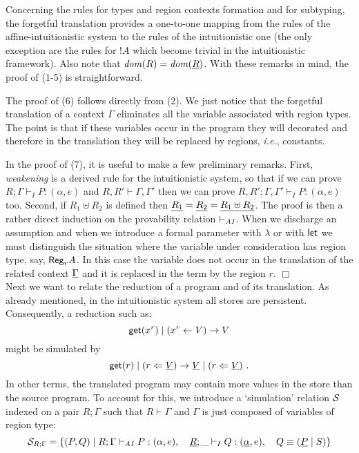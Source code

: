\documentclass[11pt]{article}
\newcommand{\qed}{\hfill${\Box}$}
\newcommand{\cl}[1]{{\cal #1}}          \newcommand{\la}{\langle}               \newcommand{\ra}{\rangle}
\newcommand{\Gives}{\vdash}             \newcommand{\IGives}{\vdash_{I}}        \newcommand{\AIGives}{\vdash_{{\it AI}}} \newcommand{\CGives}{\vdash_{C}}
\newcommand{\arrow}{\rightarrow}        \newcommand{\trarrow}{\stackrel{*}{\rightarrow}}        \newcommand{\limp}{\multimap} \newcommand{\bang}{\oc}
\newcommand{\csum}{\uplus}              \newcommand{\dpar}{\mid\!\mid}
\newcommand{\s}[1]{{\sf #1}}    \newcommand{\vc}[1]{{\bf #1}}
\newcommand{\set}[1]{\{#1\}}
\newcommand{\get}[1]{{\sf get}(#1)}
\newcommand{\store}[2]{(#1 \leftarrow #2)}
\newcommand{\pstore}[2]{(#1 \Leftarrow #2)}
\newcommand{\regtype}[2]{{\sf Reg}_{#1} #2}
\begin{document}
Concerning the rules for types and region contexts formation and for subtyping,
the forgetful translation provides a one-to-one mapping 
from the rules of the affine-intuitionistic system to the
rules of the intuitionistic one (the only exception are the rules
for $!A$ which become trivial in the intuitionistic framework).
Also note that ${\it dom}(R)= {\it dom}(\underline{R})$. 
With these remarks in mind, the proof of (1-5) is 
straightforward.

The proof of (6) follows directly from (2). We just
notice that the forgetful translation of a context $\Gamma$ 
eliminates all the variable associated with  region types.
The point is that if these variables occur in the program
they will decorated and therefore in the translation they will be replaced
by regions, {\em i.e.}, constants.

In the proof of (7), it is useful to make a few preliminary remarks.
First, {\em weakening} is a derived rule for the intuitionistic system,
so that if we can prove $R;\Gamma\IGives P:(\alpha,e)$ and 
$R,R'\Gives \Gamma,\Gamma'$ then we can
prove $R,R';\Gamma,\Gamma'\IGives P:(\alpha,e)$ too.
Second, if $R_1\csum R_2$ is defined then 
$\forget{R_{1}} = \forget{R_{2}}=\forget{R_{1}\csum R_{2}}$.
The proof is then a rather direct induction on the provability
relation $\AIGives$. 
When we discharge an assumption and when we introduce a formal
parameter with $\lambda$ or with $\s{let}$ we must distinguish
the situation where the variable under consideration has region
type, say, $\regtype{r}{A}$. In this case the variable does not occur in the
translation of the related context $\underline{\Gamma}$ and
it is replaced in the term by the region $r$.
\qed \\

Next we want to relate the reduction of a program and of its
translation. As already mentioned, in the intuitionistic system all stores are persistent.
Consequently, a reduction such as:
\[
\get{x^r} \mid \store{x^r}{V} \arrow V
\]
might be simulated by 
\[
\get{r} \mid \pstore{r}{\forget{V}} \arrow \forget{V} \mid \pstore{r}{\forget{V}}~.
\]
In other terms, the translated program may contain more values in
the store than the source program. 
To account for this, we introduce a `simulation' relation $\cl{S}$ indexed on  a pair
$R;\Gamma$ such that $R\Gives \Gamma$ and $\Gamma$ is just composed of
variables of region type:
\[
\cl{S}_{R;\Gamma}=
\set{(P,Q) \mid R;\Gamma \AIGives P:(\alpha,e), \quad 
                \forget{R};\_ \IGives Q:(\forget{\alpha},e), \quad
                Q\equiv (\forget{P}\mid S)}
\]
\end{document}
